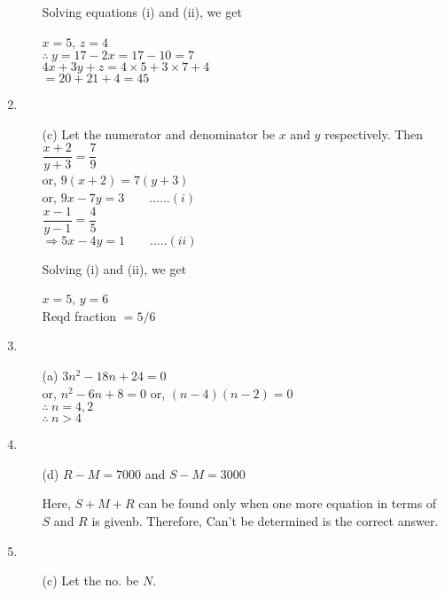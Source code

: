 \begin{multicols}{2}
\begin{enumerate}
\begin{itemize}
    Solving equations (i) and (ii), we get

    $x = 5$, $z = 4$\\
    $\therefore~ y = 17 - 2x = 17 - 10 = 7$\\
    $4x + 3y + z = 4 \times 5 + 3 \times 7 + 4$\\
    $= 20 + 21 + 4 = 45$
  \end{itemize}
\item
  \begin{itemize}
  \item[(c)] Let the numerator and denominator be $x$ and $y$ respectively. Then $\dfrac{x + 2}{y + 3} = \dfrac{7}{9}$\\
    or, $9(x + 2) = 7(y + 3)$\\
    or, $9x - 7y = 3 \qquad ......(i)$\\
    $\dfrac{x - 1}{y - 1} = \dfrac{4}{5}$\\
    $\Rightarrow 5x - 4y = 1 \qquad .....(ii)$

    Solving (i) and (ii), we get

    $x = 5$, $y = 6$\\
    Reqd fraction $= 5/6$
  \end{itemize}
\item
  \begin{itemize}
  \item[(a)] $3n^2 - 18n + 24 = 0$\\
    or, $n^2 - 6n + 8 = 0$ or, $(n - 4)(n - 2) = 0$\\
    $\therefore~ n = 4, 2$\\
    $\therefore~ n > 4$
  \end{itemize}
\item
  \begin{itemize}
  \item[(d)] $R - M = 7000$ and $S - M = 3000$

    Here, $S + M + R$ can be found only when one more equation in terms of $S$ and $R$ is givenb. Therefore, Can't be determined is the correct answer.
  \end{itemize}
\item
  \begin{itemize}
  \item[(c)] Let the no. be $N$.


\end{itemize}
\end{enumerate}
\end{multicols}
